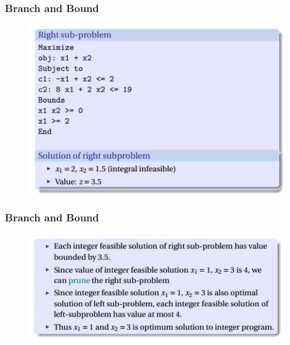 \documentclass{beamer}
\begin{document}
\begin{frame}
	\frametitle{Branch and Bound}
	\Large
	\begin{figure}
		\centering
		\includegraphics[width=1.1\linewidth]{BranchBound5}
	\end{figure}
	
\end{frame}
\begin{frame}
	\frametitle{Branch and Bound}
	\Large
	\begin{figure}
		\centering
		\includegraphics[width=1.1\linewidth]{BranchBound6}
	\end{figure}
	
\end{frame}
\end{document}

